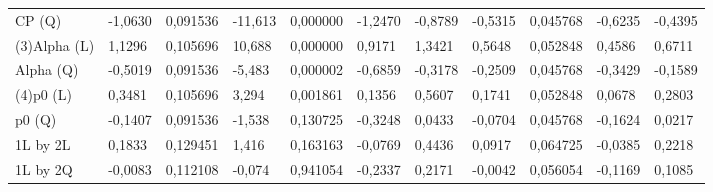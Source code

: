 \begin{table}[H]
{\begin{tabular}{lllllllllll}
CP      (Q)    & {\color[HTML]{FF0000} -1,0630}  & {\color[HTML]{FF0000} 0,091536} & {\color[HTML]{FF0000} -11,613}  & {\color[HTML]{FF0000} 0,000000} & {\color[HTML]{FF0000} -1,2470}  & {\color[HTML]{FF0000} -0,8789}  & {\color[HTML]{FF0000} -0,5315}  & {\color[HTML]{FF0000} 0,045768} & {\color[HTML]{FF0000} -0,6235}  & {\color[HTML]{FF0000} -0,4395}  \\
\rowcolor[HTML]{FFFFFF} 
(3)Alpha   (L) & {\color[HTML]{FF0000} 1,1296}   & {\color[HTML]{FF0000} 0,105696} & {\color[HTML]{FF0000} 10,688}   & {\color[HTML]{FF0000} 0,000000} & {\color[HTML]{FF0000} 0,9171}   & {\color[HTML]{FF0000} 1,3421}   & {\color[HTML]{FF0000} 0,5648}   & {\color[HTML]{FF0000} 0,052848} & {\color[HTML]{FF0000} 0,4586}   & {\color[HTML]{FF0000} 0,6711}   \\
\rowcolor[HTML]{FFFFFF} 
Alpha   (Q)    & {\color[HTML]{FF0000} -0,5019}  & {\color[HTML]{FF0000} 0,091536} & {\color[HTML]{FF0000} -5,483}   & {\color[HTML]{FF0000} 0,000002} & {\color[HTML]{FF0000} -0,6859}  & {\color[HTML]{FF0000} -0,3178}  & {\color[HTML]{FF0000} -0,2509}  & {\color[HTML]{FF0000} 0,045768} & {\color[HTML]{FF0000} -0,3429}  & {\color[HTML]{FF0000} -0,1589}  \\
\rowcolor[HTML]{FFFFFF} 
(4)p0      (L) & {\color[HTML]{FF0000} 0,3481}   & {\color[HTML]{FF0000} 0,105696} & {\color[HTML]{FF0000} 3,294}    & {\color[HTML]{FF0000} 0,001861} & {\color[HTML]{FF0000} 0,1356}   & {\color[HTML]{FF0000} 0,5607}   & {\color[HTML]{FF0000} 0,1741}   & {\color[HTML]{FF0000} 0,052848} & {\color[HTML]{FF0000} 0,0678}   & {\color[HTML]{FF0000} 0,2803}   \\
\rowcolor[HTML]{FFFFFF} 
p0      (Q)    & -0,1407                         & 0,091536                        & -1,538                          & 0,130725                        & -0,3248                         & 0,0433                          & -0,0704                         & 0,045768                        & -0,1624                         & 0,0217                          \\
\rowcolor[HTML]{FFFFFF} 
1L by 2L       & 0,1833                          & 0,129451                        & 1,416                           & 0,163163                        & -0,0769                         & 0,4436                          & 0,0917                          & 0,064725                        & -0,0385                         & 0,2218                          \\
\rowcolor[HTML]{FFFFFF} 
1L by 2Q       & -0,0083                         & 0,112108                        & -0,074                          & 0,941054                        & -0,2337                         & 0,2171                          & -0,0042                         & 0,056054                        & -0,1169                         & 0,1085                          \\

\end{tabular}}
\end{table}
